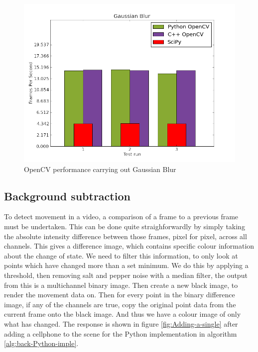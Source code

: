 \documentclass[english]{IEEEtran}
\theoremstyle{plain}
\begin{document}
\begin{figure}[H]
\begin{centering}
\includegraphics[width=0.8\columnwidth]{report_data/gaussian_blur}
\par\end{centering}

\caption{\label{fig:performance-gaussian}OpenCV performance carrying out Gaussian
Blur}



\end{figure}



\subsection{Background subtraction}

To detect movement in a video, a comparison of a frame to a previous
frame must be undertaken\cite{gao2006robust}. This can be done quite
straighforwardly by simply taking the absolute intensity difference
between those frames, pixel for pixel, across all channels. This gives
a difference image, which contains specific colour information about
the change of state. We need to filter this information, to only look
at points which have changed more than a set minimum. We do this by
applying a threshold, then removing salt and pepper noise with a median
filter, the output from this is a multichannel binary image. Then
create a new black image, to render the movement data on. Then for
every point in the binary difference image, if any of the channels
are true, copy the original point data from the current frame onto
the black image. And thus we have a colour image of only what has
changed. The response is shown in figure \ref{fig:Adding-a-single}
after adding a cellphone to the scene for the Python implementation
in algorithm \ref{alg:back-Python-imple}. 
\end{document}
